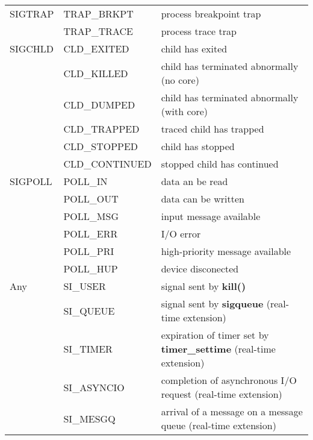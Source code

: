 \documentclass{article}
\begin{document}
\begin{table}[h!]
\begin{center}
\begin{tabular}{|l|l|l|}
            \hline
SIGTRAP     & TRAP\_BRKPT      & process breakpoint trap \\
            & TRAP\_TRACE      & process trace trap \\
            \hline
SIGCHLD     & CLD\_EXITED      & child has exited \\
            & CLD\_KILLED      & child has terminated abnormally (no core) \\
            & CLD\_DUMPED      & child has terminated abnormally (with core) \\
            & CLD\_TRAPPED     & traced child has trapped \\
            & CLD\_STOPPED     & child has stopped \\
            & CLD\_CONTINUED   & stopped child has continued \\
            \hline
SIGPOLL     & POLL\_IN         & data an be read \\
            & POLL\_OUT        & data can be written \\
            & POLL\_MSG        & input message available \\
            & POLL\_ERR        & I/O error \\
            & POLL\_PRI        & high-priority message available \\
            & POLL\_HUP        & device disconected \\
            \hline
Any         & SI\_USER        & signal sent by \textbf{kill()} \\
            & SI\_QUEUE       & signal sent by \textbf{sigqueue} (real-time extension) \\
            & SI\_TIMER       & expiration of timer set by \textbf{timer\_settime} (real-time extension) \\
            & SI\_ASYNCIO     & completion of asynchronous I/O request (real-time extension) \\
            & SI\_MESGQ       & arrival of a message on a message queue (real-time extension) \\
            \hline
        \end{tabular}
    \end{center}
\end{table}
            
\end{document}

